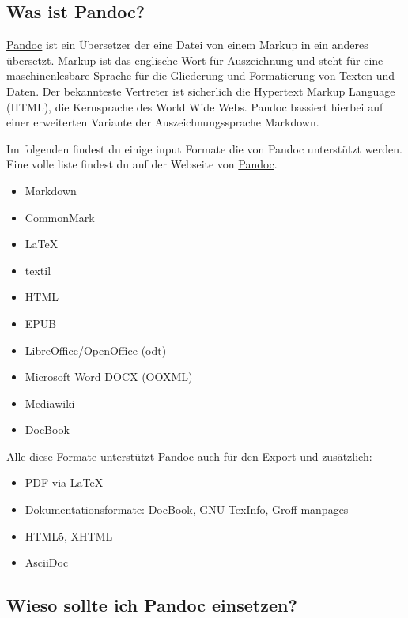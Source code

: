 \documentclass[
    12pt,
    a4paper,
            ngerman,
        bibliography=totocnumbered,
    listof=totocnumbered
]{scrartcl}
\providecommand{\tightlist}{%
  \setlength{\itemsep}{0pt}\setlength{\parskip}{0pt}}
\begin{document}
\hypertarget{was-ist-pandoc}{%
\subsection{Was ist Pandoc?}\label{was-ist-pandoc}}

\href{http://pandoc.org/}{Pandoc} ist ein Übersetzer der eine Datei von
einem Markup in ein anderes übersetzt. Markup ist das englische Wort für
Auszeichnung und steht für eine maschinenlesbare Sprache für die
Gliederung und Formatierung von Texten und Daten. Der bekannteste
Vertreter ist sicherlich die Hypertext Markup Language (HTML), die
Kernsprache des World Wide Webs. Pandoc bassiert hierbei auf einer
erweiterten Variante der Auszeichnungssprache Markdown.

Im folgenden findest du einige input Formate die von Pandoc unterstützt
werden. Eine volle liste findest du auf der Webseite von
\href{http://pandoc.org/}{Pandoc}.

\begin{itemize}
\tightlist
\item
  Markdown
\item
  CommonMark
\item
  LaTeX
\item
  textil
\item
  HTML
\item
  EPUB
\item
  LibreOffice/OpenOffice (odt)
\item
  Microsoft Word DOCX (OOXML)
\item
  Mediawiki
\item
  DocBook
\end{itemize}

Alle diese Formate unterstützt Pandoc auch für den Export und
zusätzlich:

\begin{itemize}
\tightlist
\item
  PDF via LaTeX
\item
  Dokumentationsformate: DocBook, GNU TexInfo, Groff manpages
\item
  HTML5, XHTML
\item
  AsciiDoc
\end{itemize}

\hypertarget{wieso-sollte-ich-pandoc-einsetzen}{%
\subsection{Wieso sollte ich Pandoc
einsetzen?}\label{wieso-sollte-ich-pandoc-einsetzen}}
\end{document}
